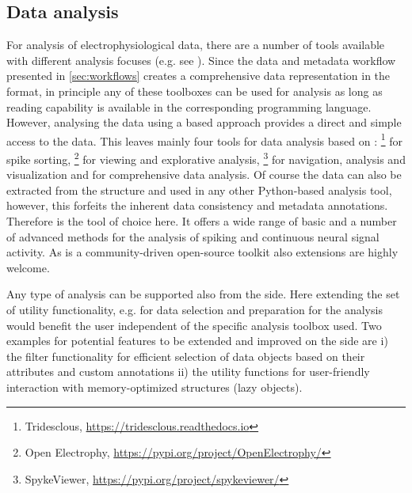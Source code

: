 \subsection{Data analysis}
For analysis of electrophysiological data, there are a number of tools available with different analysis focuses (e.g. see \citet{Unakafova_2019}). Since the data and metadata workflow presented in \cref{sec:workflows} creates a comprehensive data representation in the  format, in principle any of these toolboxes can be used for analysis as long as  reading capability is available in the corresponding programming language. However, analysing the data using a  based approach provides a direct and simple access to the data. This leaves mainly four tools for data analysis based on : \footnote{Tridesclous, \url{https://tridesclous.readthedocs.io}} for spike sorting, \footnote{Open Electrophy, \url{https://pypi.org/project/OpenElectrophy/}} \citep{Garcia_2009} for viewing and explorative analysis, \footnote{SpykeViewer, \url{https://pypi.org/project/spykeviewer/}} for navigation, analysis and visualization and  for comprehensive data analysis. Of course the data can also be extracted from the  structure and used in any other Python-based analysis tool, however, this forfeits the inherent data consistency and metadata annotations. Therefore  is the tool of choice here. It offers a wide range of basic and a number of advanced methods for the analysis of spiking and continuous neural signal activity. As  is a community-driven open-source toolkit also extensions are highly welcome.

Any type of analysis can be supported also from the  side. Here extending the set of utility functionality, e.g. for data selection and preparation for the analysis would benefit the user independent of the specific analysis toolbox used. Two examples for potential features to be extended and improved on the  side are i) the filter functionality for efficient selection of data objects based on their attributes and custom annotations ii) the utility functions for user-friendly interaction with memory-optimized  structures (lazy objects).

